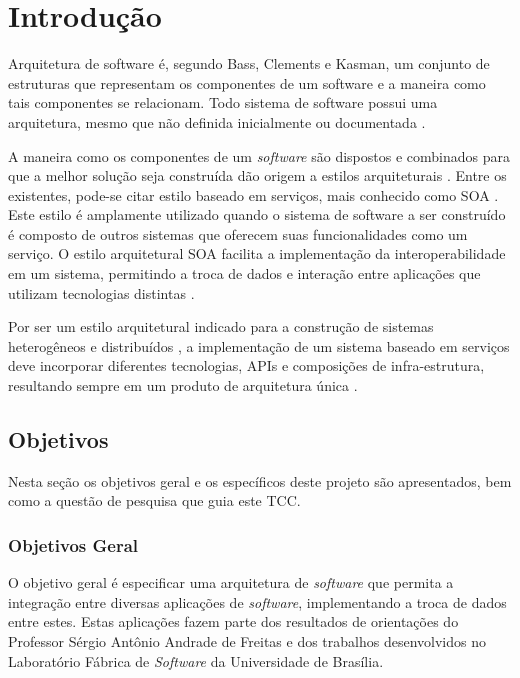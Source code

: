 \chapter[Introdução]{Introdução}
Arquitetura de software é, segundo Bass, Clements e Kasman\cite{bass_software_archi_practice_2003}, um conjunto de estruturas que representam os componentes de um software e a maneira como tais componentes se relacionam. Todo sistema de software possui uma arquitetura, mesmo que não definida inicialmente ou documentada \cite{bass_software_archi_practice_2003}.

A maneira como os componentes de um \textit{software} são dispostos e combinados para que a melhor solução seja construída dão origem a estilos arquiteturais \cite{pressman2006engenharia}. Entre os existentes, pode-se citar estilo baseado em serviços, mais conhecido como SOA \cite{josuttis_soa_2007}. Este estilo é amplamente utilizado quando o sistema de software a ser construído é composto de outros sistemas que oferecem suas funcionalidades como um serviço. O estilo arquitetural SOA facilita a implementação da interoperabilidade em um sistema, permitindo a troca de dados e interação entre aplicações que utilizam tecnologias distintas \cite{oqueesoa_2010}.

Por ser um estilo arquitetural indicado para a construção de sistemas heterogêneos e distribuídos \cite{josuttis_soa_2007}, a implementação de um sistema baseado em serviços deve incorporar diferentes tecnologias, APIs e composições de infra-estrutura, resultando sempre em um produto de arquitetura única \cite{erl_orientacaoaservico_2009}.

\section{Objetivos}

Nesta seção os objetivos geral e os específicos deste projeto são apresentados, bem como a questão de pesquisa que guia este TCC.

\subsection{Objetivos Geral}
O objetivo geral é especificar uma arquitetura de \textit{software} que permita a integração entre diversas aplicações de \textit{software}, implementando a troca de dados entre estes. Estas aplicações fazem parte dos resultados de orientações do Professor Sérgio Antônio Andrade de Freitas e dos trabalhos desenvolvidos no Laboratório Fábrica de \textit{Software} da Universidade de Brasília.

